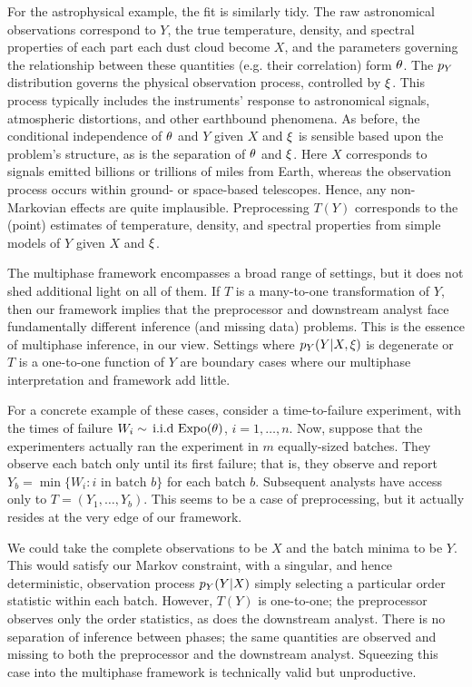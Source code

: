 For the astrophysical example, the fit is similarly tidy.
The raw astronomical observations correspond to $Y$, the true temperature, density, and spectral properties of each part each dust cloud become $X$, and the parameters governing the relationship between these quantities (e.g.
their correlation) form $\theta$.
The $p_Y$ distribution governs the physical observation process, controlled by $\xi$.
This process typically includes the instruments' response to astronomical signals, atmospheric distortions, and other earthbound phenomena.
As before, the conditional independence of $\theta$ and $Y$ given $X$ and $\xi$ is sensible based upon the problem's structure, as is the separation of $\theta$ and $\xi$. Here  $X$ corresponds to signals emitted billions or trillions of miles from Earth, whereas the observation process occurs within ground- or space-based telescopes.
Hence, any non-Markovian effects are quite implausible.
Preprocessing $T(Y)$ corresponds to the (point) estimates of temperature, density, and spectral properties from simple models of $Y$ given $X$ and $\xi$.

The multiphase framework encompasses a broad range of settings, but it does not shed additional light on all of them.
If $T$ is a many-to-one transformation of $Y$, then our framework implies that the preprocessor and downstream analyst face fundamentally different inference (and missing data) problems.
This is the essence of multiphase inference, in our view.
Settings where $p_Y(Y|X, \xi)$ is degenerate or $T$ is a one-to-one function of $Y$ are boundary cases where our multiphase interpretation and framework add little.

For a concrete example of these cases, consider a time-to-failure experiment, with the times of failure $W_i \sim \,\mbox{i.i.d}\, \operatorname{Expo}(\theta)$, $i = 1, \ldots, n$.
Now, suppose that the experimenters actually ran the experiment in $m$ equally-sized batches.
They observe each batch only until its first failure; that is, they observe and report $Y_b = \min \{W_i : i \mbox{ in batch } b \}$ for each batch $b$.
Subsequent analysts have access only to $T = (Y_1, \ldots, Y_b)$.
This seems to be a case of preprocessing, but it actually resides at the very edge of our framework.

We could take the complete observations to be $X$ and the batch minima to be $Y$.
This would satisfy our Markov constraint, with a singular, and hence deterministic, observation process $p_Y(Y | X)$ simply selecting a particular order statistic within each batch.
However, $T(Y)$ is one-to-one; the preprocessor observes only the order statistics, as does the downstream analyst.
There is no separation of inference between phases; the same quantities are observed and missing to both the preprocessor and the downstream analyst.
Squeezing this case into the multiphase framework is technically valid but unproductive.

